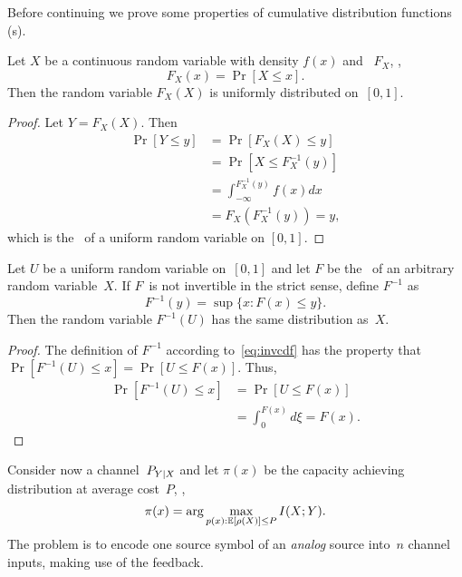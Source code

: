 Before continuing we prove some properties of cumulative distribution functions
(\cdf s).

\begin{lemma}
  \label{lem:cdfunif}
  Let $X$ be a continuous random variable with density $f(x)$ and \cdf\ $F_X$,
  \ie,
  \begin{equation*}
    F_X(x) = \Pr[X \le x].
  \end{equation*}
  Then the random variable $F_X(X)$ is uniformly distributed on~$[0,1]$.
\end{lemma}

\begin{proof}
  Let $Y = F_X(X)$. Then
  \begin{align*}
    \Pr[Y \le y] &= \Pr[F_X(X) \le y] \\
    &= \Pr[X \le F_X^{-1}(y)] \\
    &= \int_{-\infty}^{F_X^{-1}(y)} f(x) dx \\
    &= F_X(F_X^{-1}(y)) = y,
  \end{align*}
  which is the \cdf\ of a uniform random variable on $[0,1]$.
\end{proof}


\begin{lemma}
  \label{lem:invcdf}
  Let $U$ be a uniform random variable on~$[0,1]$ and let $F$ be the \cdf\ of an
  arbitrary random variable~$X$. If $F$~is not invertible in the strict sense,
  define $F^{-1}$ as
  \begin{equation}
    \label{eq:invcdf}
    F^{-1}(y) = \sup \{x : F(x) \le y\}.
  \end{equation}
  Then the random variable $F^{-1}(U)$ has the same distribution as~$X$.
\end{lemma}

\begin{proof}
  The definition of $F^{-1}$ according to~\eqref{eq:invcdf} has the property
  that $\Pr[F^{-1}(U) \le x] = \Pr[U \le F(x)]$. Thus,
  \begin{align*}
    \Pr[F^{-1}(U) \le x] &= \Pr[U \le F(x)] \\
    &= \int_0^{F(x)} d\xi = F(x).
  \end{align*}
\end{proof}

Consider now a channel~$P_{Y|X}$ and let $\pi(x)$ be the capacity achieving
distribution at average cost~$P$, \ie, 
\begin{equation*}
  \pi(x) = \arg\max_{p(x): \mathbb{E}[\rho(X)] \le P} I(X;Y).
\end{equation*}
The problem is to encode one source symbol of an \emph{analog} source into~$n$
channel inputs, making use of the feedback.

